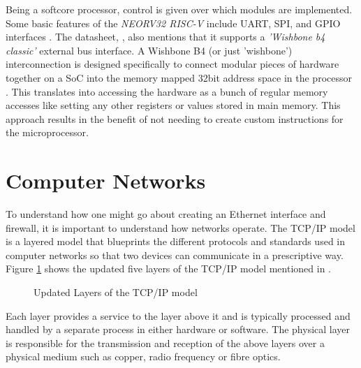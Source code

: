 Being a softcore processor, control is given over which modules are implemented. Some basic features of the \textit{NEORV32 RISC-V} include 
UART, SPI, and GPIO interfaces \cite{neorv32Datasheet}. The datasheet, \cite{neorv32Datasheet}, also mentions that it supports a \textit{'Wishbone b4 classic'} 
external bus interface. A Wishbone B4 (or just 'wishbone') interconnection is designed specifically to connect modular pieces of hardware together on a 
SoC into the memory mapped 32bit address space in the processor \cite{WishboneSpec}. This translates into accessing the hardware as a bunch of regular memory accesses like setting any other registers or values stored in main memory. This approach results in the benefit of not needing to create custom 
instructions for the microprocessor. 







\section{Computer Networks}
To understand how one might go about creating an Ethernet interface and firewall, it is important to understand how networks operate. The TCP/IP model is a layered model that blueprints the different protocols and standards used in computer networks so that two devices can communicate in a prescriptive way. 
Figure \ref{fig:tcp_ip_model} shows the updated five layers of the TCP/IP model mentioned in \cite{ciscoCCNABook}.


\begin{figure}[H]
    \centering
    \caption{Updated Layers of the TCP/IP model}
    \label{fig:tcp_ip_model}
\end{figure}

Each layer provides a service to the layer above it and is typically processed and handled by a separate process in either hardware or software. The physical layer is responsible for the transmission and reception of the above layers over a physical medium such as copper, radio frequency or fibre optics. 

